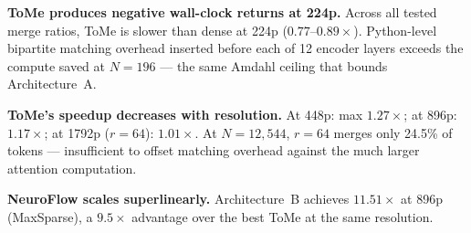 \documentclass{article}
\begin{document}
\textbf{ToMe produces negative wall-clock returns at 224p.}
Across all tested merge ratios, ToMe is slower than dense at 224p
($0.77$--$0.89\times$). Python-level bipartite matching overhead inserted
before each of 12 encoder layers exceeds the compute saved at $N=196$ ---
the same Amdahl ceiling that bounds Architecture~A.

\textbf{ToMe's speedup decreases with resolution.}
At 448p: max $1.27\times$; at 896p: $1.17\times$; at 1792p ($r=64$): $1.01\times$.
At $N=12{,}544$, $r=64$ merges only 24.5\% of tokens — insufficient to
offset matching overhead against the much larger attention computation.

\textbf{NeuroFlow scales superlinearly.}
Architecture~B achieves $11.51\times$ at 896p (MaxSparse), a $9.5\times$
advantage over the best ToMe at the same resolution.
\end{document}
